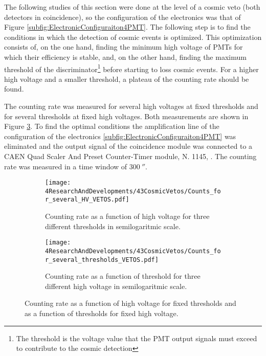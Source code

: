 The following studies of this section were done at the level of a cosmic veto (both detectors in coincidence), so the configuration of the electronics was that of Figure \ref{subfig:ElectronicConfiguraiton4PMT}. The following step is to find the conditions in which the detection of cosmic events is optimized. This optimization consists of, on the one hand, finding the minimum high voltage of PMTs for which their efficiency is stable, and, on the other hand, finding the maximum threshold of the discriminator\footnote{The threshold is the voltage value that the PMT output signals must exceed to contribute to the cosmic detection} before starting to loss cosmic events. For a higher high voltage and a smaller threshold, a plateau of the counting rate should be found.

The counting rate was measured for several high voltages at fixed thresholds and for several thresholds at fixed high voltages. Both measurements are shown in Figure \ref{fig:HVandThresholdsPLateaus}. To find the optimal conditions the amplification line of the configuration of the electronics \ref{subfig:ElectronicConfiguraiton4PMT} was eliminated and the output signal of the coincidence module was connected to a CAEN Quad Scaler And Preset Counter-Timer module, N. 1145, \cite{ScalerDataSheet}. The counting rate was measured in a time window of $300~\second$.

\begin{figure}
\centering
    \begin{subfigure}[b]{0.8\textwidth}
    \centering
    \texttt{[image: 4ResearchAndDevelopments/43CosmicVetos/Counts\_for\_several\_HV\_VETOS.pdf]}  
    \caption{Counting rate as a function of high voltage for three different thresholds in semilogaritmic scale.\label{subfig:HVPLateauVetos}}
    \end{subfigure}
    \hfill
    \begin{subfigure}[b]{0.8\textwidth}
    \centering
    \texttt{[image: 4ResearchAndDevelopments/43CosmicVetos/Counts\_for\_several\_thresholds\_VETOS.pdf]}  
    \caption{Counting rate as a function of threshold for three different high voltage in semilogaritmic scale.\label{subfig:ThresholdsPlateau}}
    \end{subfigure}
 \caption{Counting rate as a function of high voltage for fixed thresholds and as a function of thresholds for fixed high voltage.}
 \label{fig:HVandThresholdsPLateaus}
\end{figure}

